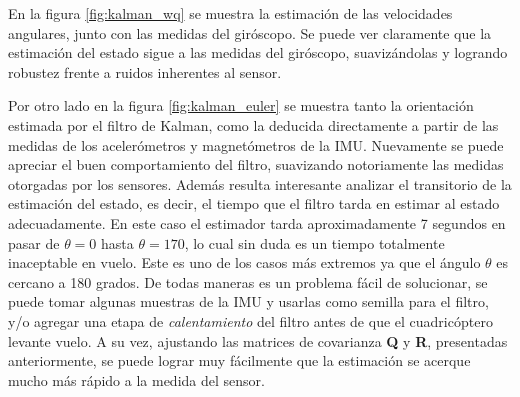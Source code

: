 \documentclass[main]{subfiles}
\begin{document}
\begin{figure} [h!]
\centering
   \hspace{10pt}
  \caption{}
  \label{fig:posyvel}
\end{figure}

En la figura \ref{fig:kalman_wq} se muestra la estimación de las velocidades angulares, junto con las medidas del giróscopo. Se puede ver claramente que la estimación del estado sigue a las medidas del giróscopo, suavizándolas y logrando robustez frente a ruidos inherentes al sensor.

Por otro lado en la figura \ref{fig:kalman_euler} se muestra tanto la orientación estimada por el filtro de Kalman, como la deducida directamente a partir de las medidas de los acelerómetros y magnetómetros de la IMU. Nuevamente se puede apreciar el buen comportamiento del filtro, suavizando notoriamente las medidas otorgadas por los sensores. Además resulta interesante analizar el transitorio de la estimación del estado, es decir, el tiempo que el filtro tarda en estimar al estado adecuadamente. En este caso el estimador tarda aproximadamente 7 segundos en pasar de $\theta = 0$ hasta $\theta = 170$, lo cual sin duda es un tiempo totalmente inaceptable en vuelo. Este es uno de los casos más extremos ya que el ángulo $\theta$ es cercano a 180 grados. De todas maneras es un problema fácil de solucionar, se puede tomar algunas muestras de la IMU y usarlas como semilla para el filtro, y/o agregar una etapa de \emph{calentamiento} del filtro antes de que el cuadricóptero levante vuelo. A su vez, ajustando las matrices de covarianza \textbf{Q} y \textbf{R}, presentadas anteriormente, se puede lograr muy fácilmente que la estimación se acerque mucho más rápido a la medida del sensor.\\
\end{document}
